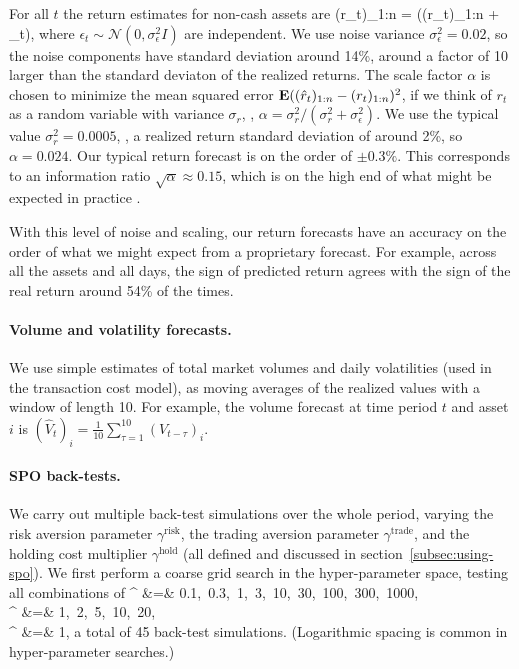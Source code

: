 \documentclass[openany]{now}
\renewcommand{\S}{section~}
\begin{document}
For all $t$ the return estimates for non-cash assets are
\BEQ\label{e-SPO-return-forecast}
(\hat r_t)_{1:n} =   \alpha  \left((r_t)_{1:n} + \epsilon_t\right),
\EEQ
where $\epsilon_t \sim \mathcal N(0,\sigma_\epsilon^2 I)$ are independent.
We use noise variance $\sigma^2_\epsilon = 0.02$, so the noise components have
standard deviation around 14\%, around a factor of 10 larger than
the standard deviaton of the realized returns.
The scale factor
$\alpha$ is chosen to minimize the mean squared error
$\mathbf{E} ((\hat r_t)_{1:n} - (r_t)_{1:n})^2$,
if we think of $r_t$ as a random variable with variance $\sigma_r$, \ie,
$\alpha = {\sigma^2_r}/{(\sigma^2_r + \sigma^2_\epsilon)}$.
We use the typical value $\sigma^2_r = 0.0005$, \ie, a
realized return standard deviation of around 2\%,
so $\alpha = 0.024$.  Our typical return forecast is on the order of
$\pm 0.3\%$.
This corresponds to an information ratio $\sqrt \alpha \approx 0.15$,
which is on the high end of what might be
expected in practice \cite{grinold1999active}.

With this level of noise and scaling, our return forecasts have an accuracy
on the order of what we might expect from a proprietary forecast.
For example, across all the assets and all days,
the sign of predicted return
agrees with the sign of the real return around 54\% of the times.

\paragraph{Volume and volatility forecasts.}
We use simple estimates of total market volumes and daily volatilities
(used in the transaction cost model),
as moving averages of the realized values with a window of length 10.
For example, the volume forecast at time period $t$ and asset $i$ is
$
(\hat V_t)_i = \frac{1}{10} \sum_{\tau=1}^{10} (V_{t-\tau})_i
$.

\paragraph{SPO back-tests.}
We carry out multiple back-test simulations over the whole period,
varying the risk aversion parameter
$\gamma^\text{risk}$, the trading
aversion parameter $\gamma^\text{trade}$, and the holding cost
multiplier $\gamma^\text{hold}$
(all defined and discussed in \S\ref{subsec:using-spo}).
We first perform a coarse grid search in the hyper-parameter space,
testing all combinations of
\BEAS
\gamma^ &=& 0.1,~0.3,~1,~3,~10,~30,~100,~300,~1000,\\
\gamma^ &=& 1,~2,~5,~10,~20,\\
\gamma^ &=& 1,
\EEAS
a total of 45 back-test simulations.
(Logarithmic spacing is common in hyper-parameter searches.)
\end{document}
